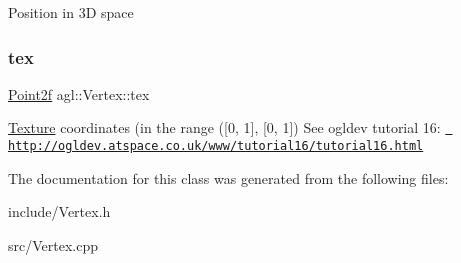 Position in 3D space \mbox{\label{classagl_1_1Vertex_a1fbcafc91c5862241918f6ab6458148b}} 
\subsubsection{\texorpdfstring{tex}{tex}}
{\footnotesize\ttfamily \mbox{\hyperlink{classagl_1_1Point2f}{Point2f}} agl\+::\+Vertex\+::tex}

\mbox{\hyperlink{classagl_1_1Texture}{Texture}} coordinates (in the range (\mbox{[}0, 1\mbox{]}, \mbox{[}0, 1\mbox{]}) See ogldev tutorial 16\+: \href{http://ogldev.atspace.co.uk/www/tutorial16/tutorial16.html}{\texttt{ http\+://ogldev.\+atspace.\+co.\+uk/www/tutorial16/tutorial16.\+html}} 

The documentation for this class was generated from the following files\+:\begin{DoxyCompactItemize}
\item 
include/Vertex.\+h\item 
src/Vertex.\+cpp\end{DoxyCompactItemize}
